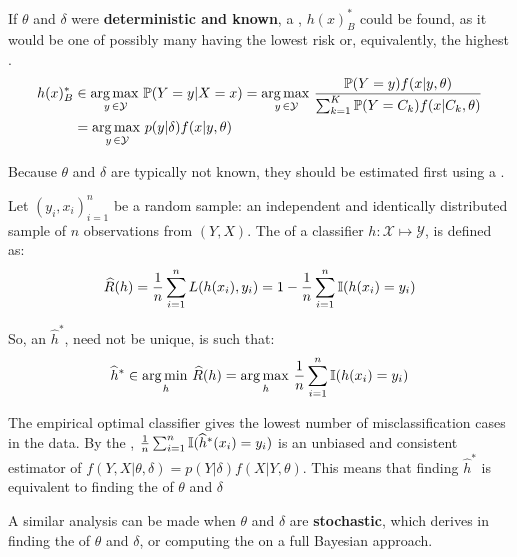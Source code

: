 If $\theta$ and $\delta$ were \textbf{deterministic and known}, a , $h(x)^*_B$ could be found, as it would be one of possibly many having the lowest risk or, equivalently, the highest .
\begin{align*}
    h(x)^*_B &\in   \operatorname*{arg\,max\,}_{y\,\in\mathcal{Y}}\operatorname{\mathbb{P}}(Y=y|X={x}) = \operatorname*{arg\,max\,}_{y\,\in\mathcal{Y}} \frac{\operatorname{\mathbb{P}}(Y=y)f(x|y,\theta)}{\sum_{k=1}^K \operatorname{\mathbb{P}}(Y=C_k)f(x|C_k,\theta)} \\ &= \operatorname*{arg\,max\,}_{y\,\in\mathcal{Y}} p(y|\delta)f(x|y,\theta)
\end{align*}

Because $\theta$ and $\delta$ are typically not known, they should be estimated first using a .

Let $(y_i,x_i)_{i=1}^n$ be a random sample: an independent and identically distributed sample of $n$ observations from $(Y,X)$. The  of a classifier $h:\mathcal{X}\mapsto\mathcal{Y}$, is defined as:
\begin{equation*}
   \widehat{R}(h) = \frac{1}{n} \sum_{i=1}^n L(h({x}_i),y_i) = 1-\frac{1}{n}\sum_{i=1}^{n}\operatorname{\mathbb{I}}(h({x}_i)=y_i)
\end{equation*}

So, an  $\widehat{h}^*$, need not be unique, is such that:
\begin{equation*}
    \widehat{h}^* \in 
    \operatorname*{arg\,min\,}_{h} \widehat{R}(h) = \operatorname*{arg\,max\,}_{h}\frac{1}{n}\sum_{i=1}^{n}\operatorname{\mathbb{I}}(h(x_i)=y_i)
\end{equation*}

The empirical optimal classifier gives the lowest number of misclassification cases in the data. By the , $\frac{1}{n}\sum_{i=1}^{n}\operatorname{\mathbb{I}}(\widehat{h}^*({x}_i)=y_i)$ is an unbiased and consistent estimator of $f(Y,X|\theta,\delta)=p(Y|\delta)f(X|Y,\theta)$. This means that finding $\widehat{h}^*$ is equivalent to finding the  of $\theta$ and $\delta$

A similar analysis can be made when $\theta$ and $\delta$ are \textbf{stochastic}, which derives in finding the  of $\theta$ and $\delta$, or computing the  on a full Bayesian approach.


